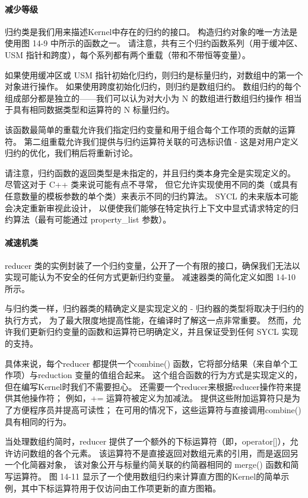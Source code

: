 \paragraph{减少等级}

归约类是我们用来描述Kernel中存在的归约的接口。 构造归约对象的唯一方法是使用图 14-9 中所示的函数之一。 
请注意，共有三个归约函数系列（用于缓冲区、USM 指针和跨度），每个系列都有两个重载（带和不带恒等变量）。

如果使用缓冲区或 USM 指针初始化归约，则归约是标量归约，对数组中的第一个对象进行操作。 
如果使用跨度初始化归约，则归约是数组归约。 
数组归约的每个组成部分都是独立的——我们可以认为对大小为 N 的数组进行数组归约操作
相当于具有相同数据类型和运算符的 N 标量归约。

该函数最简单的重载允许我们指定归约变量和用于组合每个工作项的贡献的运算符。 
第二组重载允许我们提供与归约运算符关联的可选标识值 - 这是对用户定义归约的优化，我们稍后将重新讨论。

请注意，归约函数的返回类型是未指定的，并且归约类本身完全是实现定义的。 
尽管这对于 C++ 类来说可能有点不寻常，
但它允许实现使用不同的类（或具有任意数量的模板参数的单个类）来表示不同的归约算法。 
SYCL 的未来版本可能会决定重新审视此设计，
以便使我们能够在特定执行上下文中显式请求特定的归约算法（最有可能通过 property\_list 参数）。

\paragraph{减速机类}

reducer 类的实例封装了一个归约变量，公开了一个有限的接口，确保我们无法以实现可能认为不安全的任何方式更新归约变量。 
减速器类的简化定义如图 14-10 所示。

与归约类一样，归约器类的精确定义是实现定义的 - 归约器的类型将取决于归约的执行方式，
为了最大限度地提高性能，在编译时了解这一点非常重要。 
然而，允许我们更新归约变量的函数和运算符已明确定义，并且保证受到任何 SYCL 实现的支持。

具体来说，每个reducer 都提供一个combine() 函数，它将部分结果（来自单个工作项）与reduction 变量的值组合起来。 
这个组合函数的行为方式是实现定义的，但在编写Kernel时我们不需要担心。 
还需要一个reducer来根据reducer操作符来提供其他操作符； 
例如，+= 运算符被定义为加减法。 提供这些附加运算符只是为了方便程序员并提高可读性； 
在可用的情况下，这些运算符与直接调用combine() 具有相同的行为。

当处理数组约简时，reducer 提供了一个额外的下标运算符（即，operator[]），允许访问数组的各个元素。 
该运算符不是直接返回对数组元素的引用，而是返回另一个化简器对象，
该对象公开与标量约简关联的约简器相同的 merge() 函数和简写运算符。 
图 14-11 显示了一个使用数组归约来计算直方图的Kernel的简单示例，其中下标运算符用于仅访问由工作项更新的直方图箱。

